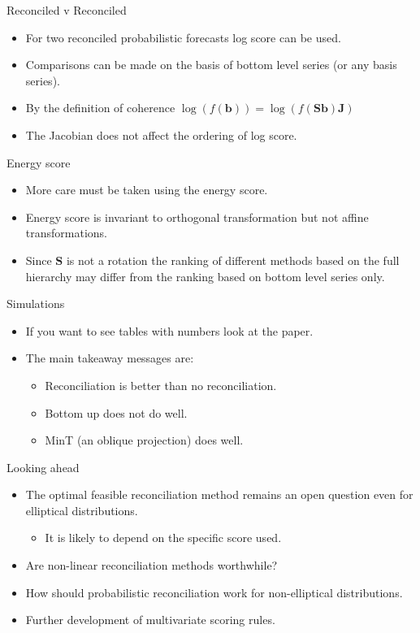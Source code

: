 \documentclass{beamer}
\begin{document}
  \begin{frame}{Reconciled v Reconciled}
	\begin{itemize}
		\item For two reconciled probabilistic forecasts log score can be used.
		\item Comparisons can be made on the basis of bottom level series (or any basis series).
		\item By the definition of coherence $\log (f({\bm b}))=\log (f({\bm S}{\bm b}){\bm J})$
		\item The Jacobian does not affect the ordering of log score.
	\end{itemize}
  \end{frame}
  \begin{frame}{Energy  score}
  	\begin{itemize}
  		\item More care must be taken using the energy score.
  		\item Energy score is invariant to orthogonal transformation but not affine transformations.
  		\item Since ${\bm S}$ is not a rotation the ranking of different methods based on the full hierarchy may differ from the ranking based on bottom level series only.
  	\end{itemize}
  \end{frame}
   \begin{frame}{Simulations}
   	\begin{itemize}
   		\item If you want to see tables with numbers look at the paper.
   		\item The main takeaway messages are:
   		    \begin{itemize}
   		    	\item Reconciliation is better than no reconciliation.
   		    	\item Bottom up does not do well.
   		    	\item MinT (an oblique projection) does well.
   		    \end{itemize} 
   	\end{itemize}
   \end{frame}
   \begin{frame}{Looking ahead}
     \begin{itemize}
     	\item The optimal feasible reconciliation method remains an open question even for elliptical distributions.
     	\begin{itemize}
     		\item It is likely to depend on the specific score used.
     	\end{itemize}
        \item Are non-linear reconciliation methods worthwhile?
        \item How should probabilistic reconciliation work for non-elliptical distributions.
        \item Further development of multivariate scoring rules.
     \end{itemize}	
   \end{frame}
\end{document}

